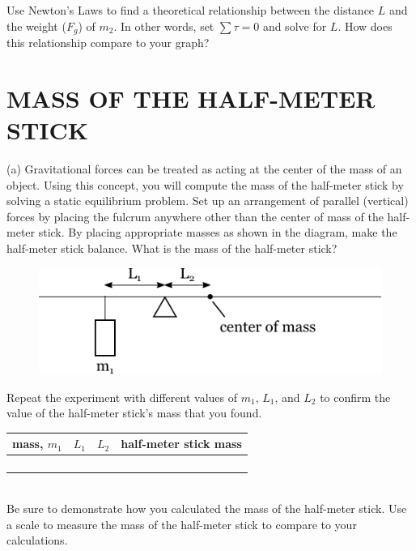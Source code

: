 \documentclass[11pt,letterpaper]{article}
\begin{document}
Use Newton's Laws to find a theoretical relationship between the distance $L$ and the weight ($F_g$) of $m_2$. In other words, set $\sum\tau=0$ and solve for $L$. How does this relationship compare to your graph?


\section{MASS OF THE HALF-METER STICK}
(a) Gravitational forces can be treated as acting at the center of the mass of an object. Using this concept, you will compute the mass of the half-meter stick by solving a static equilibrium problem. Set up an arrangement of parallel (vertical) forces by placing the fulcrum anywhere other than the center of mass of the half-meter stick. By placing appropriate masses as shown in the diagram, make the half-meter stick balance.  What is the mass of the half-meter stick?

\begin{figure}[h]
\begin{center}
\includegraphics{./lab6_part2a.pdf}
\end{center}
\end{figure}

Repeat the experiment with different values of $m_1$, $L_1$, and $L_2$ to confirm the value of the half-meter stick's mass that you found.
 
\begin{tabularx}{\linewidth}{|Y|Y|Y|Y|}
\hline
mass, $m_1$ & $L_1$ & $L_2$ & half-meter stick mass \\
\hline &&&\\
\hline &&&\\
\hline &&&\\
\hline &&&\\
\hline
\end{tabularx}\\

Be sure to demonstrate how you calculated the mass of the half-meter stick. Use a scale to measure the mass of the half-meter stick to compare to your calculations.
\end{document}
